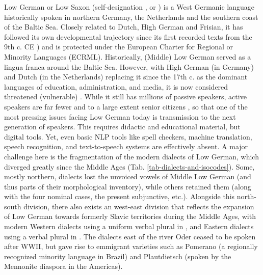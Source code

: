 Low German or Low Saxon (self-designation ,  or ) is a West Germanic language historically spoken in northern Germany, the Netherlands and the southern coast of the Baltic Sea. Closely related to Dutch, High German and Frisian, it has followed its own developmental trajectory since its first recorded texts from the 9th c. CE \cite{price-2010-heliand-phd}) and is protected under the European Charter for Regional or Minority Languages (ECRML).
Historically, (Middle) Low German served as a lingua franca around the Baltic Sea. However, with High German (in Germany) and Dutch (in the Netherlands) replacing it since the 17th c. as the dominant languages of education, administration, and media, it is now considered threatened (vulnerable) \cite[p.25]{moseley2010atlas}. While it still has millions of passive speakers, active speakers are far fewer and to a large extent senior citizens \cite{AdlerEhlersGoltzetal.2019}, so that one of the most pressing issues facing Low German today is transmission to the next generation of speakers. This requires didactic and educational material, but digital tools. Yet, even basic NLP tools like spell checkers, machine translation, speech recognition, and text-to-speech systems are effectively absent. A major challenge here is the fragmentation of the modern dialects of Low German, which diverged greatly since the Middle Ages (Tab. \ref{tab-dialects-and-isocodes}). Some, mostly northern, dialects lost the unvoiced vowels of Middle Low German (and thus parts of their morphological inventory), while others retained them (along with the four nominal cases, the present subjunctive, etc.). Alongside this north-south division, there also exists an west-east division that reflects the expansion of Low German towards formerly Slavic territories during the Middle Ages, with modern Western dialects using a uniform verbal plural in , and Eastern dialects using a verbal plural in . The dialects east of the river Oder ceased to be spoken after WWII, but gave rise to emmigrant varieties such as Pomerano (a regionally recognized minority language in Brazil) and Plautdietsch (spoken by the Mennonite diaspora in the Americas).

